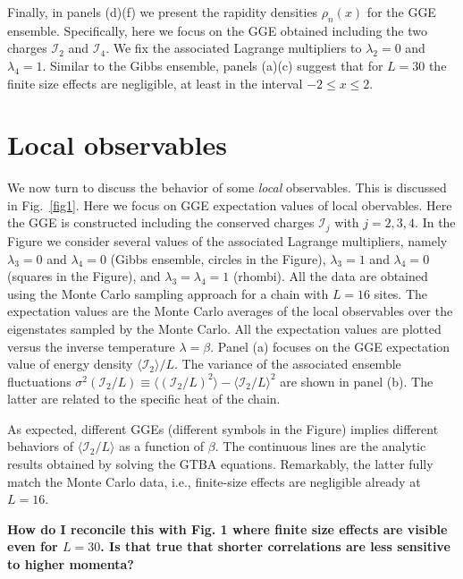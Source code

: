 \documentclass[twocolumn,superscriptaddress,prb,10pt]{revtex4-1}
\begin{document}
Finally, in panels (d)(f) we present the rapidity densities $\rho_n(x)$ for the GGE ensemble. 
Specifically, here we focus on the GGE obtained including the two charges ${\mathcal I}_2$ and 
${\mathcal I}_4$. We fix the associated Lagrange multipliers to $\lambda_2=0$ and $\lambda_4=1$. 
Similar to the Gibbs ensemble, panels (a)(c) suggest that for $L=30$ the finite size effects 
are negligible, at least in the interval $-2\le x\le 2$. 



\section{Local observables} 

We now turn to discuss the behavior of some {\it local} observables. This is discussed 
in Fig.~\ref{fig1}. Here we focus on GGE expectation values of local obervables. 
Here the GGE is constructed including the conserved charges ${\mathcal I}_j$ with $j=2,3,4$. 
In the Figure we consider several values of the associated Lagrange multipliers, namely 
$\lambda_3=0$ and $\lambda_4=0$ (Gibbs ensemble, circles in the Figure), $\lambda_3=1$ and 
$\lambda_4=0$ (squares in the Figure), and $\lambda_3=\lambda_4=1$ (rhombi). All the data 
are obtained using the Monte Carlo sampling approach for a chain with $L=16$ sites. The 
expectation values are the Monte Carlo averages of the local observables over the eigenstates 
sampled by the Monte Carlo. All the expectation values are plotted versus the inverse temperature $\lambda=\beta$. 
Panel (a) focuses on the GGE expectation value of energy density $\langle{\mathcal I}_2\rangle/L$. 
The variance of the associated ensemble fluctuations $\sigma^2({\mathcal I}_2/L)\equiv 
\langle ({\mathcal I}_2/L)^2\rangle-\langle{\mathcal I}_2/L\rangle^2$ are shown in 
panel (b). The latter are related to the specific heat of the chain. 

As expected, different GGEs (different symbols in the Figure) implies different behaviors of  
$\langle {\mathcal I}_2/L\rangle$ as a function of $\beta$. The continuous lines are the 
analytic results obtained by solving the GTBA equations. Remarkably, the latter fully 
match the Monte Carlo data, i.e., finite-size effects are negligible already at $L=16$. 

{\bf How do I reconcile this with Fig. 1 where finite size effects are visible even for 
$L=30$. Is that true that shorter correlations are less sensitive to higher momenta?}
\end{document}
